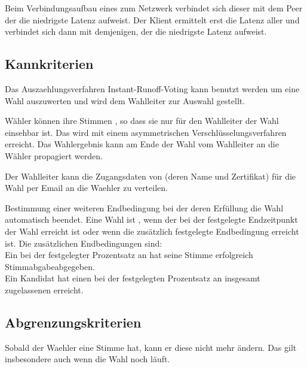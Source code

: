\documentclass[parskip=full,11pt,twoside]{scrartcl}
\begin{document}
Beim Verbindungsaufbau eines  zum \gls{Netzwerk} verbindet sich dieser mit dem \gls{Peer} der die niedrigste \gls{Latenz} aufweist. Der \gls{Klient} ermittelt erst die \gls{Latenz} aller  und verbindet sich dann mit demjenigen, der die niedrigste \gls{Latenz} aufweist.

\subsection{Kannkriterien}

Das \gls{Auszaehlungsverfahren} \gls{Instant-Runoff-Voting} kann benutzt werden um eine Wahl auszuwerten und wird dem \gls{Wahlleiter} zur Auswahl gestellt.

Wähler können ihre Stimmen , so dass sie nur für den \gls{Wahlleiter} der Wahl einsehbar ist.
Das wird mit einem asymmetrischen Verschlüsselungsverfahren erreicht.
Das Wahlergebnis kann am Ende der Wahl vom Wahlleiter an die Wähler propagiert werden.

Der \gls{Wahlleiter} kann die Zugangsdaten von  (deren Name und \gls{Zertifikat}) für die \gls{Wahl} per Email an die \gls{Waehler} zu verteilen.

Bestimmung einer weiteren Endbedingung bei der  deren Erfüllung die \gls{Wahl} automatisch beendet.
Eine Wahl ist , wenn der bei der  festgelegte Endzeitpunkt der Wahl erreicht ist oder wenn die zusätzlich festgelegte Endbedingung erreicht ist.
Die zusätzlichen Endbedingungen sind:\\
Ein bei der  festgelegter Prozentsatz an  hat seine Stimme erfolgreich \gls{Stimmabgabe}{abgegeben}.\\
Ein \gls{Kandidat} hat einen bei der  festgelegten Prozentsatz an insgesamt zugelassenen  erreicht.

\subsection{Abgrenzungskriterien}
Sobald der \gls{Waehler} eine Stimme  hat, kann er diese nicht mehr ändern. Das gilt insbesondere auch wenn die \gls{Wahl} noch läuft.
\end{document}
